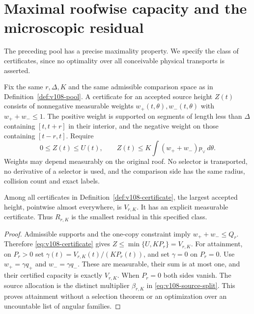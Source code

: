 \section{Maximal roofwise capacity and the microscopic residual}
\label{sec:v108-optimality}
The preceding pool has a precise maximality property. We specify the
class of certificates, since no optimality over all conceivable
physical transports is asserted.

\begin{definition}
\label{def:v108-certificate}
Fix the same $r,\Delta,K$ and the same admissible comparison space
as in Definition~\ref{def:v108-pool}. A certificate for an accepted
source height $Z(t)$ consists of nonnegative measurable weights
$w_+(t,\theta),w_-(t,\theta)$ with $w_++w_-\le1$.
The positive weight is supported on segments of length less than
$\Delta$ containing $[t,t+r]$ in their interior, and the negative
weight on those containing $[t-r,t]$. Require
\begin{equation}\label{eq:v108-certificate}
 0\le Z(t)\le U(t),\qquad
 Z(t)\le K\int (w_++w_-)p_\vee\,d\theta.
\end{equation}
Weights may depend measurably on the original roof. No selector is
transported, no derivative of a selector is used, and the comparison
side has the same radius, collision count and exact labels.
\end{definition}

\begin{theorem}\label{thm:v108-maximal}
Among all certificates in Definition~\ref{def:v108-certificate},
the largest accepted height, pointwise almost everywhere, is
$V_{r,K}$. It has an explicit measurable certificate. Thus
$R_{r,K}$ is the smallest residual in this specified class.
\end{theorem}
\begin{proof}
Admissible supports and the one-copy constraint imply
$w_++w_-\le Q_r$. Therefore \eqref{eq:v108-certificate} gives
$Z\le\min\{U,KP_r\}=V_{r,K}$.
For attainment, on $P_r>0$ set
$\gamma(t)=V_{r,K}(t)/(KP_r(t))$, and set $\gamma=0$ on $P_r=0$.
Use $w_+=\gamma q_+$ and $w_-=\gamma q_-$.
These are measurable, their sum is at most one, and their certified
capacity is exactly $V_{r,K}$. When $P_r=0$ both sides vanish.
The source allocation is the distinct multiplier $\beta_{r,K}$
in \eqref{eq:v108-source-split}. This proves attainment without a
selection theorem or an optimization over an uncountable list of
angular families.
\end{proof}

